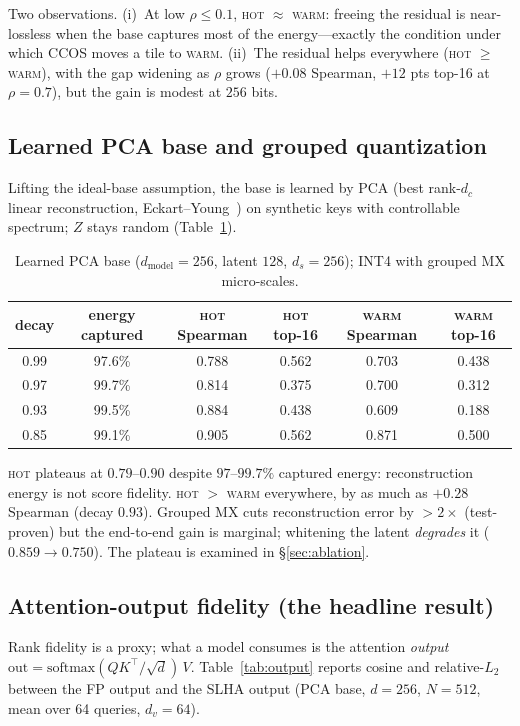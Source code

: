 \documentclass[11pt]{article}
\theoremstyle{plain}
\theoremstyle{definition}
\newcommand{\dc}{d_c}
\newcommand{\ds}{d_s}
\begin{document}
Two observations. (i)~At low $\rho \le 0.1$, \textsc{hot} $\approx$
\textsc{warm}: freeing the residual is near-lossless when the base
captures most of the energy---exactly the condition under which CCOS
moves a tile to \textsc{warm}. (ii)~The residual helps everywhere
(\textsc{hot} $\ge$ \textsc{warm}), with the gap widening as $\rho$ grows
($+0.08$ Spearman, $+12$ pts top-16 at $\rho=0.7$), but the gain is
modest at $256$ bits.

\subsection{Learned PCA base and grouped quantization}
\label{sec:learned}
Lifting the ideal-base assumption, the base is learned by PCA
(best rank-$\dc$ linear reconstruction, Eckart--Young~\cite{eckartyoung})
on synthetic keys with controllable spectrum; $Z$ stays random
(Table~\ref{tab:pca}).

\begin{table}[t]
\centering
\caption{Learned PCA base ($d_{\text{model}}=256$, latent $128$,
$\ds=256$); INT4 with grouped MX micro-scales.}
\label{tab:pca}
\small
\begin{tabular}{@{}cccccc@{}}
\toprule
decay & energy captured & \textsc{hot} Spearman & \textsc{hot} top-16 & \textsc{warm} Spearman & \textsc{warm} top-16 \\
\midrule
0.99 & 97.6\% & 0.788 & 0.562 & 0.703 & 0.438 \\
0.97 & 99.7\% & 0.814 & 0.375 & 0.700 & 0.312 \\
0.93 & 99.5\% & 0.884 & 0.438 & 0.609 & 0.188 \\
0.85 & 99.1\% & 0.905 & 0.562 & 0.871 & 0.500 \\
\bottomrule
\end{tabular}
\end{table}

\textsc{hot} plateaus at $0.79$--$0.90$ despite $97$--$99.7\%$ captured
energy: reconstruction energy is not score fidelity. \textsc{hot} $>$
\textsc{warm} everywhere, by as much as $+0.28$ Spearman (decay $0.93$).
Grouped MX cuts reconstruction error by $>2\times$ (test-proven) but the
end-to-end gain is marginal; whitening the latent \emph{degrades} it
($0.859 \to 0.750$). The plateau is examined in \S\ref{sec:ablation}.

\subsection{Attention-output fidelity (the headline result)}
\label{sec:output}
Rank fidelity is a proxy; what a model consumes is the attention
\emph{output} $\mathrm{out} = \mathrm{softmax}(QK^\top/\sqrt{d})\,V$.
Table~\ref{tab:output} reports cosine and relative-$L_2$ between the FP
output and the SLHA output (PCA base, $d=256$, $N=512$, mean over 64
queries, $d_v=64$).
\end{document}
